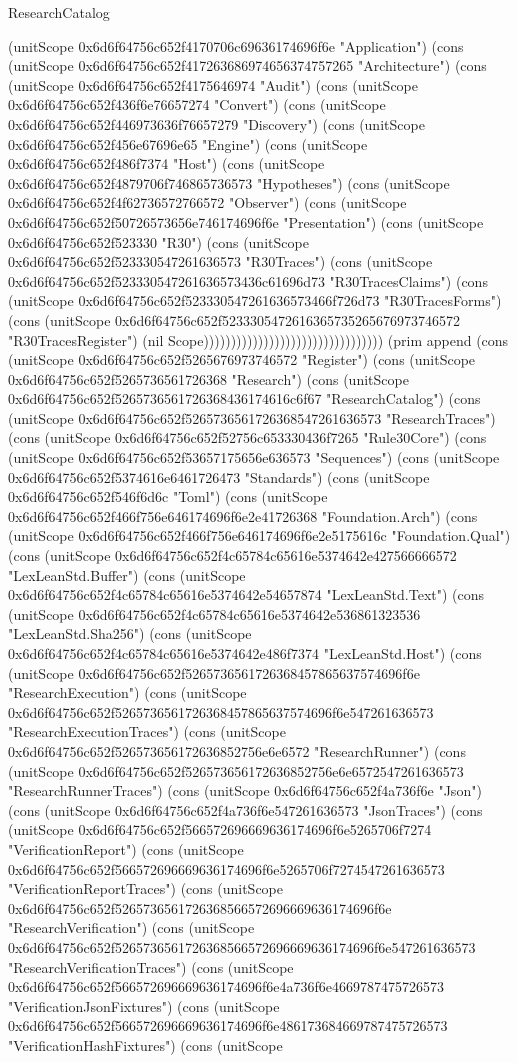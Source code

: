 \begin{lexlean}{ResearchCatalog}
\begin{semanticmodule}
{(unitScope 0x6d6f64756c652f4170706c69636174696f6e "Application") (cons (unitScope 0x6d6f64756c652f417263686974656374757265 "Architecture") (cons (unitScope 0x6d6f64756c652f4175646974 "Audit") (cons (unitScope 0x6d6f64756c652f436f6e76657274 "Convert") (cons (unitScope 0x6d6f64756c652f446973636f76657279 "Discovery") (cons (unitScope 0x6d6f64756c652f456e67696e65 "Engine") (cons (unitScope 0x6d6f64756c652f486f7374 "Host") (cons (unitScope 0x6d6f64756c652f4879706f746865736573 "Hypotheses") (cons (unitScope 0x6d6f64756c652f4f62736572766572 "Observer") (cons (unitScope 0x6d6f64756c652f50726573656e746174696f6e "Presentation") (cons (unitScope 0x6d6f64756c652f523330 "R30") (cons (unitScope 0x6d6f64756c652f523330547261636573 "R30Traces") (cons (unitScope 0x6d6f64756c652f523330547261636573436c61696d73 "R30TracesClaims") (cons (unitScope 0x6d6f64756c652f523330547261636573466f726d73 "R30TracesForms") (cons (unitScope 0x6d6f64756c652f5233305472616365735265676973746572 "R30TracesRegister") (nil Scope))))))))))))))))))))))))))))))))) (prim append (cons (unitScope 0x6d6f64756c652f5265676973746572 "Register") (cons (unitScope 0x6d6f64756c652f5265736561726368 "Research") (cons (unitScope 0x6d6f64756c652f5265736561726368436174616c6f67 "ResearchCatalog") (cons (unitScope 0x6d6f64756c652f5265736561726368547261636573 "ResearchTraces") (cons (unitScope 0x6d6f64756c652f52756c653330436f7265 "Rule30Core") (cons (unitScope 0x6d6f64756c652f53657175656e636573 "Sequences") (cons (unitScope 0x6d6f64756c652f5374616e6461726473 "Standards") (cons (unitScope 0x6d6f64756c652f546f6d6c "Toml") (cons (unitScope 0x6d6f64756c652f466f756e646174696f6e2e41726368 "Foundation.Arch") (cons (unitScope 0x6d6f64756c652f466f756e646174696f6e2e5175616c "Foundation.Qual") (cons (unitScope 0x6d6f64756c652f4c65784c65616e5374642e427566666572 "LexLeanStd.Buffer") (cons (unitScope 0x6d6f64756c652f4c65784c65616e5374642e54657874 "LexLeanStd.Text") (cons (unitScope 0x6d6f64756c652f4c65784c65616e5374642e536861323536 "LexLeanStd.Sha256") (cons (unitScope 0x6d6f64756c652f4c65784c65616e5374642e486f7374 "LexLeanStd.Host") (cons (unitScope 0x6d6f64756c652f5265736561726368457865637574696f6e "ResearchExecution") (cons (unitScope 0x6d6f64756c652f5265736561726368457865637574696f6e547261636573 "ResearchExecutionTraces") (cons (unitScope 0x6d6f64756c652f526573656172636852756e6e6572 "ResearchRunner") (cons (unitScope 0x6d6f64756c652f526573656172636852756e6e6572547261636573 "ResearchRunnerTraces") (cons (unitScope 0x6d6f64756c652f4a736f6e "Json") (cons (unitScope 0x6d6f64756c652f4a736f6e547261636573 "JsonTraces") (cons (unitScope 0x6d6f64756c652f566572696669636174696f6e5265706f7274 "VerificationReport") (cons (unitScope 0x6d6f64756c652f566572696669636174696f6e5265706f7274547261636573 "VerificationReportTraces") (cons (unitScope 0x6d6f64756c652f5265736561726368566572696669636174696f6e "ResearchVerification") (cons (unitScope 0x6d6f64756c652f5265736561726368566572696669636174696f6e547261636573 "ResearchVerificationTraces") (cons (unitScope 0x6d6f64756c652f566572696669636174696f6e4a736f6e4669787475726573 "VerificationJsonFixtures") (cons (unitScope 0x6d6f64756c652f566572696669636174696f6e486173684669787475726573 "VerificationHashFixtures") (cons (unitScope }
\end{semanticmodule}
\end{lexlean}
